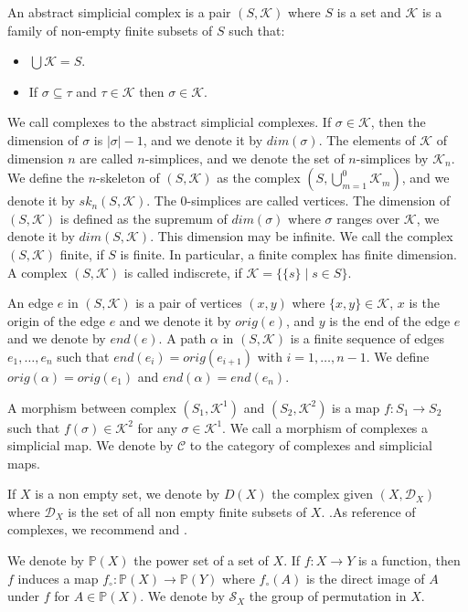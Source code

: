 \documentclass{amsart}
\begin{document}
An abstract simplicial complex is a pair $(S,\mathcal{K})$ where $S$ is a set and $\mathcal{K}$ is a family of non-empty finite subsets of $S$ such that:
\begin{itemize}
\item $\bigcup\mathcal{K}=S$.
\item If $\sigma\subseteq \tau$ and $\tau\in \mathcal{K}$ then $\sigma\in\mathcal{K}$.
\end{itemize}
We call complexes to the abstract simplicial complexes.  If $\sigma\in \mathcal{K}$, then the dimension of $\sigma$ is $\vert\sigma\vert-1$, and we denote it by $dim(\sigma)$. The elements of $\mathcal{K}$ of dimension $n$ are called $n$-simplices, and we denote the set of $n$-simplices by $\mathcal{K}_n$. We define the $n$-skeleton of $(S,\mathcal{K})$ as the complex $(S,\bigcup_{m=1}^0\mathcal{K}_m)$, and we denote it by $sk_n(S,\mathcal{K})$. The $0$-simplices are called vertices. The dimension of $(S,\mathcal{K})$ is defined as the supremum of $dim(\sigma)$ where $\sigma$ ranges over $\mathcal{K}$, we denote it by $dim(S,\mathcal{K})$. This dimension may be infinite. We call the complex $(S,\mathcal{K})$  finite, if $S$ is finite. In particular, a finite complex has finite dimension. A complex $(S,\mathcal{K})$ is called indiscrete, if $\mathcal{K}=\{\{s\}\mid s\in S\}$.

An edge $e$ in $(S,\mathcal{K})$ is a pair of vertices  $(x,y)$ where $\{x,y\}\in\mathcal{K}$, $x$ is the origin of the edge $e$ and we denote it by $orig(e)$, and $y$ is the end of the edge $e$ and we denote by $end(e)$. A path $\alpha$ in $(S,\mathcal{K})$ is a finite sequence of edges $e_1,\dots,e_n$ such that $end(e_i)=orig(e_{i+1})$ with $i=1,\dots,n-1$. We define $orig(\alpha)=orig(e_1)$ and $end(\alpha)=end(e_n)$. 

A morphism between complex $(S_1,\mathcal{K}^1)$ and $(S_2,\mathcal{K}^2)$ is a map $f\colon S_1\longrightarrow S_2$ such that $f(\sigma)\in \mathcal{K}^2$ for any $\sigma\in\mathcal{K}^1$. We call a morphism of complexes a simplicial map. We  denote by $\mathcal{C}$ to the category of complexes and simplicial maps.

If $X$ is a non empty set, we denote by $D(X)$ the complex given $(X,\mathcal{D}_X)$ where $\mathcal{D}_X$ is the set of all non empty finite subsets of $X$. .As reference of complexes, we recommend \cite{singer2015lecture}  and \cite{spanier1989algebraic}.


We denote by $\mathbb{P}(X)$ the power set of a set of $X$. If $f\colon X\longrightarrow Y$ is a function, then $f$ induces a map $f_\circ \colon\mathbb{P}(X)\longrightarrow \mathbb{P}(Y)$ where $f_\circ(A)$ is the direct image of $A$ under $f$ for $A\in\mathbb{P}(X)$. We denote by $\mathcal{S}_X$ the group of permutation in $X$.
\end{document}
